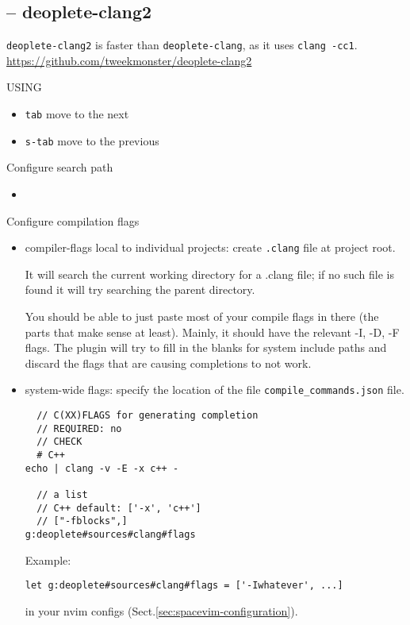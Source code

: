 \subsection{-- deoplete-clang2}
\label{sec:deoplete-clang2}

\verb!deoplete-clang2! is faster than \verb!deoplete-clang!, as it uses
\verb!clang -cc1!. 
\url{https://github.com/tweekmonster/deoplete-clang2}

USING
\begin{itemize}
  \item \verb!tab! move to the next
  \item \verb!s-tab! move to the previous
\end{itemize}

Configure search path
\begin{itemize}
  \item  
  
\end{itemize}


Configure compilation flags
\begin{itemize}
  \item  compiler-flags local to individual projects: create \verb!.clang! file
  at project root.
  
  It will search the current working directory for a .clang file; if no such
  file is found it will try searching the parent directory.

You should be able to just paste most of your compile flags in there (the parts
that make sense at least). Mainly, it should have the relevant -I, -D, -F flags.
The plugin will try to fill in the blanks for system include paths and discard
the flags that are causing completions to not work.


  \item system-wide flags: specify the location of the file
  \verb!compile_commands.json! file.

\begin{verbatim}
  // C(XX)FLAGS for generating completion
  // REQUIRED: no
  // CHECK
  # C++
echo | clang -v -E -x c++ -

  // a list
  // C++ default: ['-x', 'c++']
  // ["-fblocks",]
g:deoplete#sources#clang#flags
\end{verbatim}

Example:
\begin{verbatim}
let g:deoplete#sources#clang#flags = ['-Iwhatever', ...] 
\end{verbatim}
in your nvim configs (Sect.\ref{sec:spacevim-configuration}).

\end{itemize}



